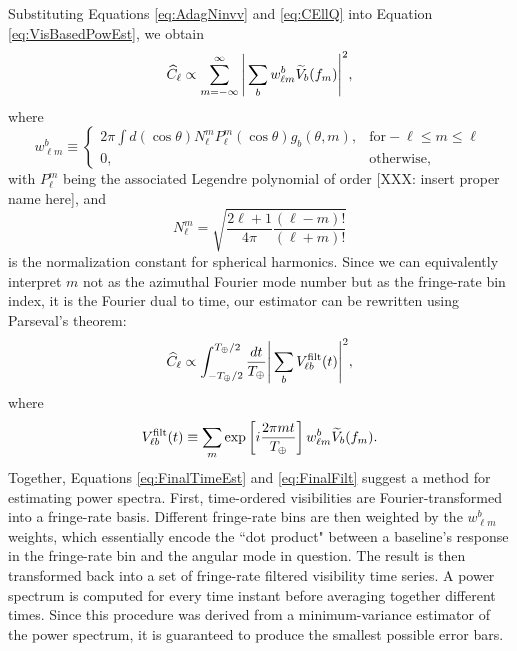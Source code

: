 \documentclass[twocolumn,apj,numberedappendix]{emulateapj}
\begin{document}
Substituting Equations \eqref{eq:AdagNinvv} and \eqref{eq:CEllQ} into Equation \eqref{eq:VisBasedPowEst}, we obtain
\begin{equation}
\label{eq:StillFringe}
\widehat{C}_\ell \propto \sum _{m=-\infty}^\infty \Bigg{|} \sum_b w_{\ell m}^b \widetilde{V}_b (f_m) \Bigg{|}^2,
\end{equation}
where
\begin{equation}
w_{\ell m}^b \equiv
\begin{cases}
2 \pi \int d(\cos \theta) N_{\ell}^m P_{\ell}^{m} (\cos \theta) g_b(\theta,m),& \textrm{for} -\ell \leq m \leq \ell \\
0, & \textrm{otherwise,}
\end{cases}
\end{equation}
with $P_\ell^m$ being the associated Legendre polynomial of order [XXX: insert proper name here], and
\begin{equation}
N_\ell^m = \sqrt{\frac{2\ell + 1}{4 \pi} \frac{(\ell-m)!}{(\ell + m )!}}
\end{equation}
is the normalization constant for spherical harmonics.  Since we can equivalently interpret $m$ not as the azimuthal Fourier mode number but as the fringe-rate bin index, it is the Fourier dual to time, our estimator can be rewritten using Parseval's theorem:
\begin{equation}
\label{eq:FinalTimeEst}
\widehat{C}_\ell \propto  \int_{-T_\Earth / 2}^{T_\Earth /2} \frac{dt}{T_\Earth} \Bigg{|} \sum_b V^\textrm{filt}_{\ell b} (t) \Bigg{|}^2,
\end{equation}
where
\begin{equation}
\label{eq:FinalFilt}
V^\textrm{filt}_{\ell b} (t) \equiv  \sum_m \exp \left[i \frac{2 \pi m t}{T_\Earth}\right]  w_{\ell m}^b \widetilde{V}_b (f_m).
\end{equation}
Together, Equations \ref{eq:FinalTimeEst} and \ref{eq:FinalFilt} suggest a method for estimating power spectra.  First, time-ordered visibilities are Fourier-transformed into a fringe-rate basis.  Different fringe-rate bins are then weighted by the $w_{\ell m}^b$ weights, which essentially encode the ``dot product" between a baseline's response in the fringe-rate bin and the angular mode in question.  The result is then transformed back into a set of fringe-rate filtered visibility time series.  A power spectrum is computed for every time instant before averaging together different times.  Since this procedure was derived from a minimum-variance estimator of the power spectrum, it is guaranteed to produce the smallest possible error bars.
\end{document}
